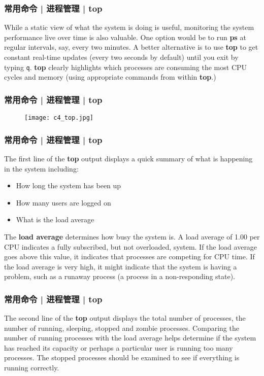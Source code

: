 \begin{frame}[fragile]
  \frametitle{常用命令 | 进程管理 | top}
  While a static view of what the system is doing is useful, monitoring the system performance live over time is also valuable. One option would be to run \textbf{ps} at regular intervals, say, every two minutes. A better alternative is to use \textbf{top} to get constant real-time updates (every two seconds by default) until you exit by typing \verb|q|. \textbf{top} clearly highlights which processes are consuming the most CPU cycles and memory (using appropriate commands from within \textbf{top}.)
\end{frame}

\begin{frame}
  \frametitle{常用命令 | 进程管理 | top}
  \begin{figure}
    \centering
    \texttt{[image: c4\_top.jpg]}
  \end{figure}
\end{frame}

\begin{frame}
  \frametitle{常用命令 | 进程管理 | top}
  The first line of the \textbf{top} output displays a quick summary of what is happening in the system including:
  \begin{itemize}
    \item How long the system has been up
    \item How many users are logged on
    \item What is the load average
  \end{itemize}
  The \textbf{load average} determines how busy the system is. A load average of 1.00 per CPU indicates a fully subscribed, but not overloaded, system. If the load average goes above this value, it indicates that processes are competing for CPU time. If the load average is very high, it might indicate that the system is having a problem, such as a runaway process (a process in a non-responding state).
\end{frame}

\begin{frame}
  \frametitle{常用命令 | 进程管理 | top}
  The second line of the \textbf{top} output displays the total number of processes, the number of running, sleeping, stopped and zombie processes. Comparing the number of running processes with the load average helps determine if the system has reached its capacity or perhaps a particular user is running too many processes. The stopped processes should be examined to see if everything is running correctly.
\end{frame}

